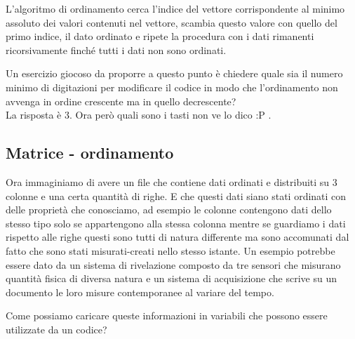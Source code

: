 \documentclass[11pt,fleqn]{book} %
\begin{document}
L'algoritmo di ordinamento cerca l'indice del vettore corrispondente al minimo assoluto dei valori contenuti nel vettore, scambia questo valore con quello del primo indice, il dato ordinato e ripete la procedura con i dati rimanenti ricorsivamente finché tutti i dati non sono ordinati.

Un esercizio giocoso da proporre a questo punto è chiedere quale sia il numero minimo di digitazioni per modificare il codice in modo che l'ordinamento non avvenga in ordine crescente ma in quello decrescente?\\
La risposta è 3. Ora però quali sono i tasti non ve lo dico :P .




\subsection{Matrice - ordinamento}

Ora immaginiamo di avere un file che contiene dati ordinati e distribuiti su 3 colonne e una certa quantità di righe. E che questi dati siano stati ordinati con delle proprietà che conosciamo, ad esempio le colonne contengono dati dello stesso tipo solo se appartengono alla stessa colonna mentre se guardiamo i dati rispetto alle righe questi sono tutti di natura differente ma sono accomunati dal fatto che sono stati misurati-creati nello stesso istante. Un esempio potrebbe essere dato da un sistema di rivelazione composto da tre sensori che misurano quantità fisica di diversa natura e un sistema di acquisizione che scrive su un documento le loro misure contemporanee al variare del tempo.

Come possiamo caricare queste informazioni in variabili che possono essere utilizzate da un codice?
\end{document}
